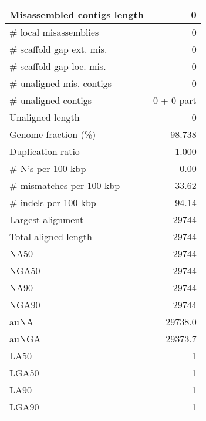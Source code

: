 \documentclass[12pt,a4paper]{article}
\begin{document}
\begin{table}[ht]
\begin{center}
\begin{tabular}{|l*{1}{|r}|}
Misassembled contigs length & 0 \\ \hline
\# local misassemblies & 0 \\ \hline
\# scaffold gap ext. mis. & 0 \\ \hline
\# scaffold gap loc. mis. & 0 \\ \hline
\# unaligned mis. contigs & 0 \\ \hline
\# unaligned contigs & 0 + 0 part \\ \hline
Unaligned length & 0 \\ \hline
Genome fraction (\%) & 98.738 \\ \hline
Duplication ratio & 1.000 \\ \hline
\# N's per 100 kbp & 0.00 \\ \hline
\# mismatches per 100 kbp & 33.62 \\ \hline
\# indels per 100 kbp & 94.14 \\ \hline
Largest alignment & 29744 \\ \hline
Total aligned length & 29744 \\ \hline
NA50 & 29744 \\ \hline
NGA50 & 29744 \\ \hline
NA90 & 29744 \\ \hline
NGA90 & 29744 \\ \hline
auNA & 29738.0 \\ \hline
auNGA & 29373.7 \\ \hline
LA50 & 1 \\ \hline
LGA50 & 1 \\ \hline
LA90 & 1 \\ \hline
LGA90 & 1 \\ \hline
\end{tabular}
\end{center}
\end{table}
\end{document}
